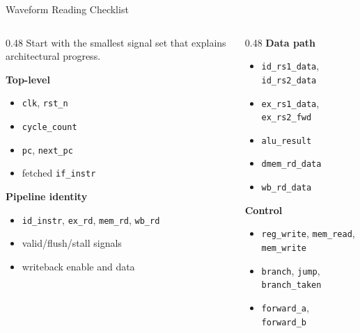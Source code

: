 \documentclass[aspectratio=169,10pt]{beamer}
\begin{document}
\begin{frame}{Waveform Reading Checklist}
  \begin{columns}[T]
    \begin{column}{0.48\textwidth}
      Start with the smallest signal set that explains architectural progress.

      \vspace{0.6em}
      \textbf{Top-level}
      \begin{itemize}
        \item \texttt{clk}, \texttt{rst\_n}
        \item \texttt{cycle\_count}
        \item \texttt{pc}, \texttt{next\_pc}
        \item fetched \texttt{if\_instr}
      \end{itemize}

      \vspace{0.5em}
      \textbf{Pipeline identity}
      \begin{itemize}
        \item \texttt{id\_instr}, \texttt{ex\_rd}, \texttt{mem\_rd}, \texttt{wb\_rd}
        \item valid/flush/stall signals
        \item writeback enable and data
      \end{itemize}
    \end{column}
    \begin{column}{0.48\textwidth}
      \textbf{Data path}
      \begin{itemize}
        \item \texttt{id\_rs1\_data}, \texttt{id\_rs2\_data}
        \item \texttt{ex\_rs1\_data}, \texttt{ex\_rs2\_fwd}
        \item \texttt{alu\_result}
        \item \texttt{dmem\_rd\_data}
        \item \texttt{wb\_rd\_data}
      \end{itemize}

      \vspace{0.5em}
      \textbf{Control}
      \begin{itemize}
        \item \texttt{reg\_write}, \texttt{mem\_read}, \texttt{mem\_write}
        \item \texttt{branch}, \texttt{jump}, \texttt{branch\_taken}
        \item \texttt{forward\_a}, \texttt{forward\_b}
      \end{itemize}
    \end{column}
  \end{columns}
\end{frame}
\end{document}
